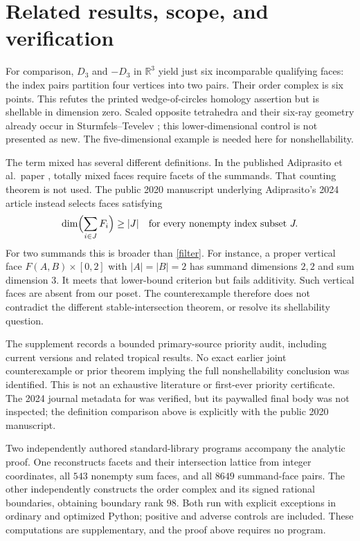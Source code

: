 \documentclass[11pt]{article}
\newcommand{\R}{\mathbb R}
\newcommand{\dimn}{\operatorname{dim}}
\begin{document}
\section{Related results, scope, and verification}
For comparison, $D_3$ and $-D_3$ in $\R^3$ yield just six incomparable
qualifying faces: the index pairs partition four vertices into two
pairs. Their order complex is six points. This refutes the printed
wedge-of-circles homology assertion but is shellable in dimension zero.
Scaled opposite tetrahedra and their six-ray geometry already occur
in Sturmfels--Tevelev \cite[Examples~1.3 and 4.10]{ST}; this lower-dimensional control is not presented as new.
The five-dimensional example is needed here for nonshellability.

The term mixed has several different definitions. In the published
Adiprasito et al.\ paper \cite[Section~1.2]{AB}, totally mixed faces
require facets of the summands. That counting theorem is not used.
The public 2020 manuscript underlying Adiprasito's 2024 article
\cite[p.~2, Corollary~1.3 of the public manuscript]{A} instead selects
faces satisfying
\[
 \dimn\Bigl(\sum_{i\in J}F_i\Bigr)\ge |J|
 \quad\text{for every nonempty index subset }J.
\]
For two summands this is broader than \eqref{filter}.
For instance, a proper vertical face $F(A,B)\times[0,2]$ with
$|A|=|B|=2$ has summand dimensions $2,2$ and sum dimension $3$.
It meets that lower-bound criterion but fails additivity. Such
vertical faces are absent from our poset. The counterexample therefore
does not contradict the different stable-intersection theorem, or
resolve its shellability question.

The supplement records a bounded primary-source priority audit,
including current versions and related tropical results. No exact
earlier joint counterexample or prior theorem implying the full
nonshellability conclusion was identified. This is not an exhaustive
literature or first-ever priority certificate. The 2024 journal
metadata for \cite{A} was verified, but its paywalled final body was
not inspected; the definition comparison above is explicitly with
the public 2020 manuscript.

Two independently authored standard-library programs accompany the
analytic proof. One reconstructs facets and their intersection lattice
from integer coordinates, all $543$ nonempty sum faces, and all $8649$
summand-face pairs. The other independently constructs the order complex
and its signed rational boundaries, obtaining boundary rank $98$.
Both run with explicit exceptions in ordinary and optimized Python;
positive and adverse controls are included. These computations are
supplementary, and the proof above requires no program.
\end{document}
